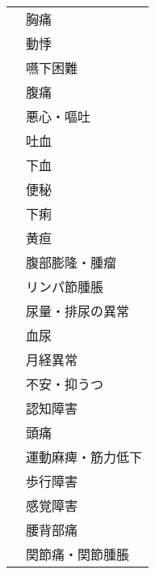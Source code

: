 \begin{xltabular}{\linewidth}{XX}
 & 胸痛 \\
 & 動悸 \\
 & 嚥下困難 \\
 & 腹痛 \\
 & 悪心・嘔吐 \\
 & 吐血 \\
 & 下血 \\
 & 便秘 \\
 & 下痢 \\
 & 黄疸 \\
 & 腹部膨隆・腫瘤 \\
 & リンパ節腫脹 \\
 & 尿量・排尿の異常 \\
 & 血尿 \\
 & 月経異常 \\
 & 不安・抑うつ \\
 & 認知障害 \\
 & 頭痛 \\
 & 運動麻痺・筋力低下 \\
 & 歩行障害 \\
 & 感覚障害 \\
 & 腰背部痛 \\
 & 関節痛・関節腫脹 \\
\bottomrule
\end{xltabular}


